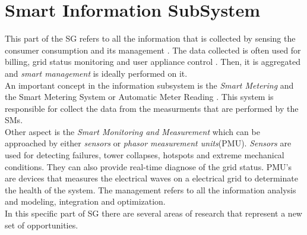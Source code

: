 \section{Smart Information SubSystem}
This part of the SG refers to all the information that is collected by sensing the consumer consumption and its management . The data collected is often used for billing, grid status monitoring and user appliance control \cite{journals/comsur/FangMXY12}. Then, it is aggregated and \textit{smart management} is ideally performed on it.\\
An important concept in the information subsystem  is the \textit{Smart Metering} and the Smart Metering System or Automatic Meter Reading . This system is responsible for collect the data from the measurments that are performed by the SMs.\\
Other aspect is the \textit{Smart Monitoring and Measurement} which can be approached by either \textit{sensors} or \textit{phasor measurement units}(PMU). \textit{Sensors} are used for detecting failures, tower collapses, hotspots and extreme mechanical conditions. They can also provide real-time diagnose of the grid status. PMU's are devices that measures the electrical waves on a electrical grid to determinate the health  of the system.
The management refers to all the information analysis and modeling, integration and optimization.\\
In this specific part of SG there are several areas of research that represent a new set of opportunities.



